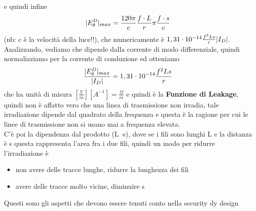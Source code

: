 \documentclass[oneside, 12pt]{extbook}
\DeclarePairedDelimiter{\abs}{\lvert}{\rvert}
\begin{document}
e quindi infine 
\begin{equation}
	\abs{E_{\theta}^D}_{max} = \frac{120 \pi}{c} \frac{f \cdot L}{r} \pi \frac{f\cdot s}{c}
\end{equation}
(nb: c è la velocità della luce!!), che numericamente è $1,31 \cdot 10^{-14} \frac{f^2 L s}{r} \abs{I_D}$.\\Analizzando, vediamo che dipende dalla corrente di modo differenziale, quindi normalizziamo per la corrente di conduzione ed otteniamo 
\begin{equation}
	\dfrac{\abs{E_{\theta}^D}_{max}}{\abs{I_D}} = 1,31 \cdot 10^{-14} \frac{f^2 L s}{r}
\end{equation}
che ha unità di misura $[\tfrac{V}{m}] [A^{-1}] = \tfrac{\Omega}{m}$ e quindi è la \textbf{Funzione di Leakage}, quindi non è affatto vero che una linea di trasmissione non irradia, tale irradiazione dipende dal quadrato della frequenza e questa è la ragione per cui le linee di trasmissione non si usano mai a frequenza elevata.\\C'è poi la dipendenza dal prodotto (L $\cdot$s), dove se i fili sono lunghi L e la distanza è s questa rappresenta l'area fra i due fili, quindi un modo per ridurre l'irradiazione è
\begin{itemize}
	\item non avere delle tracce lunghe, ridurre la lunghezza dei fili
	\item avere delle tracce molto vicine, diminuire s
\end{itemize}
Questi sono gli aspetti che devono essere tenuti conto nella security dy design
\end{document}
